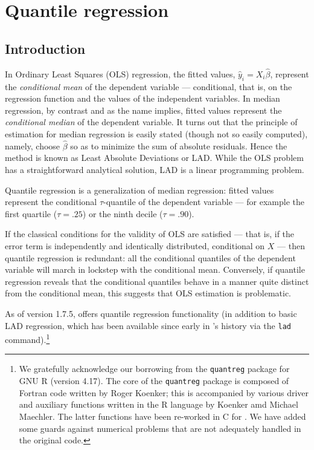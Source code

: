 \chapter{Quantile regression}
\label{chap:quantreg}

\section{Introduction}
\label{sec:rq-intro}

In Ordinary Least Squares (OLS) regression, the fitted values,
$\hat{y}_i = X_i\hat{\beta}$, represent the \emph{conditional mean} of
the dependent variable --- conditional, that is, on the regression
function and the values of the independent variables.  In median
regression, by contrast and as the name implies, fitted values
represent the \emph{conditional median} of the dependent variable.  It
turns out that the principle of estimation for median regression is
easily stated (though not so easily computed), namely, choose
$\hat{\beta}$ so as to minimize the sum of absolute residuals.  Hence
the method is known as Least Absolute Deviations or LAD.  While the OLS
problem has a straightforward analytical solution, LAD is a linear
programming problem.

Quantile regression is a generalization of median regression: fitted
values represent the conditional $\tau$-quantile of the dependent
variable --- for example the first quartile ($\tau = .25$) or the
ninth decile ($\tau = .90$).

If the classical conditions for the validity of OLS are satisfied ---
that is, if the error term is independently and identically
distributed, conditional on $X$ --- then quantile regression is
redundant: all the conditional quantiles of the dependent variable
will march in lockstep with the conditional mean.  Conversely, if
quantile regression reveals that the conditional quantiles behave in a
manner quite distinct from the conditional mean, this suggests that
OLS estimation is problematic.

As of version 1.7.5,  offers quantile regression
functionality (in addition to basic LAD regression, which has been
available since early in 's history via the \texttt{lad}
command).\footnote{We gratefully acknowledge our borrowing from the
  \texttt{quantreg} package for GNU \textsf{R} (version 4.17).  The
  core of the \texttt{quantreg} package is composed of Fortran code
  written by Roger Koenker; this is accompanied by various driver and
  auxiliary functions written in the \textsf{R} language by Koenker
  amd Michael Maechler.  The latter functions have been re-worked in C
  for .  We have added some guards against numerical
  problems that are not adequately handled in the original code.}

